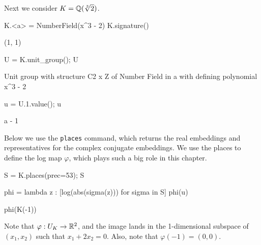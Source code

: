 Next we consider $K=\mathbb{Q}(\sqrt[3]{2})$.
\begin{sagecode}
\begin{sagecell}
K.<a> = NumberField(x^3 - 2)
K.signature()
\end{sagecell}
\begin{sageout}
(1, 1)
\end{sageout}
\begin{sagecell}
U = K.unit_group(); U
\end{sagecell}
\begin{sageout}
Unit group with structure C2 x Z of Number Field in a with
defining polynomial x^3 - 2
\end{sageout}
\begin{sagecell}
\end{sagecell}
\begin{sageout}
[-1, a - 1]
\end{sageout}
\begin{sagecell}
u = U.1.value(); u
\end{sagecell}
\begin{sageout}
a - 1
\end{sageout}
\end{sagecode} %

Below we use the \verb|places| command, which returns the real embeddings
and representatives for the complex conjugate embeddings.
We use the places to define the log map $\varphi$, which plays such a big
role in this chapter.
\begin{sagecode} %
\begin{sagecell}
S = K.places(prec=53); S
\end{sagecell}
\begin{sageout}
\end{sageout}
\begin{sagecell}
phi = lambda z : [log(abs(sigma(z))) for sigma in S]
phi(u)
\end{sagecell}
\begin{sageout}
[-1.3473773483293832, 0.673688674164692]
\end{sageout}
\begin{sagecell}
phi(K(-1))
\end{sagecell}
\begin{sageout}
[0.0, 0.0]
\end{sageout}
\end{sagecode}
Note that $\varphi:U_K \to \mathbb{R}^2$, and the image lands in the
1-dimensional subspace of $(x_1,x_2)$ such that $x_1 +2x_2 = 0$. Also,
note that $\varphi(-1)=(0,0)$.


